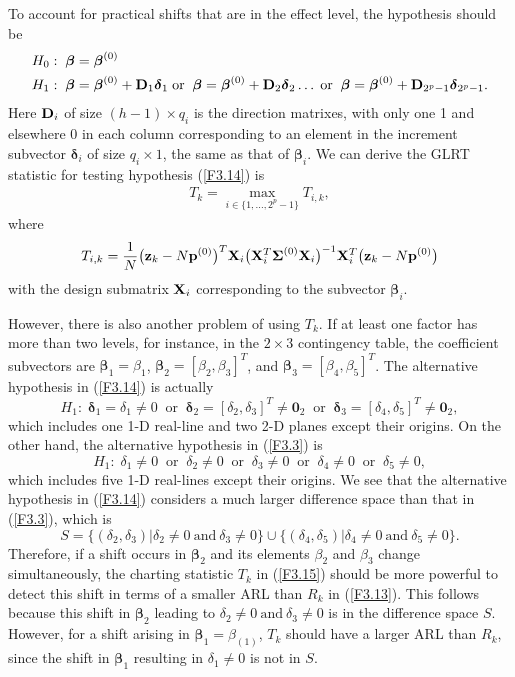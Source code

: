 To account for practical shifts that are in the effect level, the  hypothesis should
be
\begin{align}\label{F3.14}
&H_0:\;\bm{\beta}=\bm{\beta}^{(0)}\\\nonumber
&H_1:\;\bm{\beta}=\bm{\beta}^{(0)}+{\bf D}_1\bm\delta_1
\;\mathrm{or}\;\;\bm{\beta}=\bm{\beta}^{(0)}+{\bf D}_2\bm\delta_2\ldots\;
\mathrm{or}\;\;\bm{\beta}=\bm{\beta}^{(0)}+{\bf D}_{2^p-1}\bm\delta_{2^p-1}.
\end{align}
Here ${\bf D}_i$ of size $(h-1)\times q_i$ is the direction matrixes, with only one
1 and elsewhere 0 in each column corresponding to an element in the increment
subvector $\bm\delta_i$ of size $q_i\times 1$, the same as that of $\bm\beta_i$. We
can derive the GLRT statistic for testing hypothesis (\ref{F3.14}) is
\begin{align}
T_k=\max_{i\in\{1,\ldots,2^p-1\}}T_{i,k},\label{F3.15}
\end{align}
where
\[
T_{i,k}=\frac{1}{N}\big({\bf z}_k-N{\bf p}^{(0)}\big)^T{\bf X}_i\big({\bf
X}_i^T\boldsymbol{\Sigma}^{(0)}{\bf X}_i\big)^{-1}{\bf X}_i^T\big({\bf z}_k-N{\bf
p}^{(0)}\big)
\]
with the design submatrix ${\bf X}_i$ corresponding to the subvector $\bm\beta_i$.

However, there is also another problem of using $T_k$. If at least one factor has
more than two levels, for instance, in the $2\times 3$ contingency table, the
coefficient subvectors are $\bm\beta_1=\beta_1$, $\bm\beta_2=[\beta_2,\beta_3]^T$,
and $\bm\beta_3=[\beta_4,\beta_5]^T$. The alternative hypothesis in (\ref{F3.14}) is
actually
\[
H_1:\;\bm\delta_1=\delta_1\neq
0\;\;\mathrm{or}\;\;\bm\delta_2=[\delta_2,\delta_3]^T\neq \bm
0_2\;\;\mathrm{or}\;\;\bm\delta_3=[\delta_4,\delta_5]^T\neq\bm 0_2,
\]
which includes one 1-D real-line and two 2-D planes except their origins. On the
other hand, the alternative hypothesis in (\ref{F3.3}) is
\[
H_1:\;\delta_1\neq 0\;\;\mathrm{or}\;\;\delta_2\neq 0\;\;\mathrm{or}\;\;\delta_3\neq
0\;\;\mathrm{or}\;\;\delta_4\neq 0\;\;\mathrm{or}\;\;\delta_5\neq 0,
\]
which includes five 1-D real-lines except their origins. We see that the alternative
hypothesis in (\ref{F3.14}) considers a much larger difference space than that in
(\ref{F3.3}), which is
\[
S=\{(\delta_2,\delta_3)|\delta_2\neq 0\ \mathrm{and}\ \delta_3\neq
0\}\cup\{(\delta_4,\delta_5)|\delta_4\neq 0\ \mathrm{and}\ \delta_5\neq 0\}.
\]
Therefore, if a shift occurs in $\bm\beta_2$ and its elements $\beta_2$ and
$\beta_3$ change simultaneously, the charting statistic $T_k$ in (\ref{F3.15})
should be more powerful to detect this shift in terms of a smaller ARL than $R_k$ in
(\ref{F3.13}). This follows because this shift in $\bm\beta_2$ leading to
$\delta_2\neq 0\ \mathrm{and}\ \delta_3\neq 0$ is in the difference space $S$.
However, for a shift arising in $\bm\beta_1=\beta_{(1)}$, $T_k$ should have a larger
ARL than $R_k$, since the shift in $\bm\beta_1$ resulting in $\delta_1\neq 0$ is not
in $S$.

